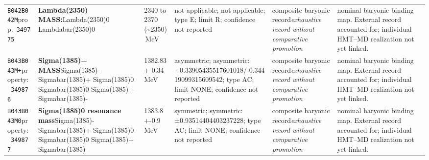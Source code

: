 \begin{landscape}
\begin{longtable}{L{1.85cm}L{4.45cm}L{2.35cm}L{4.05cm}L{3.35cm}L{7.15cm}}
\texttt{B042}\newline \texttt{B042M}\newline prop.\ \texttt{349775} & \textbf{Lambda(2350) MASS:}\newline Lambda(2350)0 \textbar{}\allowbreak{} Lambdabar(2350)0 & 2340 to 2370 (\textasciitilde{}2350)\,MeV & not applicable; not applicable; type E; limit R; confidence not reported & composite baryonic record\newline \emph{exhaustive record without comparative promotion} & nominal baryonic binding map. External record accounted for; individual HMT--MD realization not yet linked. \\
\texttt{B043}\newline \texttt{B043M+}\newline property:\ \texttt{349876} & \textbf{Sigma(1385)+ MASS}\newline Sigma(1385)- \textbar{}\allowbreak{} Sigmabar(1385)+ \textbar{}\allowbreak{} Sigma(1385)0 \textbar{}\allowbreak{} Sigmabar(1385)0 \textbar{}\allowbreak{} Sigma(1385)+ \textbar{}\allowbreak{} Sigmabar(1385)- & 1382.83+-0.34\,MeV & asymmetric; asymmetric: +0.33905435517601018/-0.34419099315609542; type AC; limit NONE; confidence not reported & composite baryonic record\newline \emph{exhaustive record without comparative promotion} & nominal baryonic binding map. External record accounted for; individual HMT--MD realization not yet linked. \\
\texttt{B043}\newline \texttt{B043M0}\newline property:\ \texttt{349877} & \textbf{Sigma(1385)0 resonance mass}\newline Sigma(1385)- \textbar{}\allowbreak{} Sigmabar(1385)+ \textbar{}\allowbreak{} Sigma(1385)0 \textbar{}\allowbreak{} Sigmabar(1385)0 \textbar{}\allowbreak{} Sigma(1385)+ \textbar{}\allowbreak{} Sigmabar(1385)- & 1383.8+-0.9\,MeV & symmetric; symmetric: ±0.93514404403237228; type AC; limit NONE; confidence not reported & composite baryonic record\newline \emph{exhaustive record without comparative promotion} & nominal baryonic binding map. External record accounted for; individual HMT--MD realization not yet linked. \\

\end{longtable}
\end{landscape}
